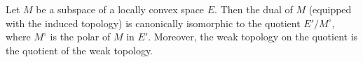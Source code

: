 Let $M$ be a subspace of a locally convex space $E$. Then the dual of $M$ (equipped with the induced topology) is canonically isomorphic to the quotient $E' / M^\circ$, where $M^\circ$ is the polar of $M$ in $E'$. Moreover, the weak topology on the quotient is the quotient of the weak topology.
